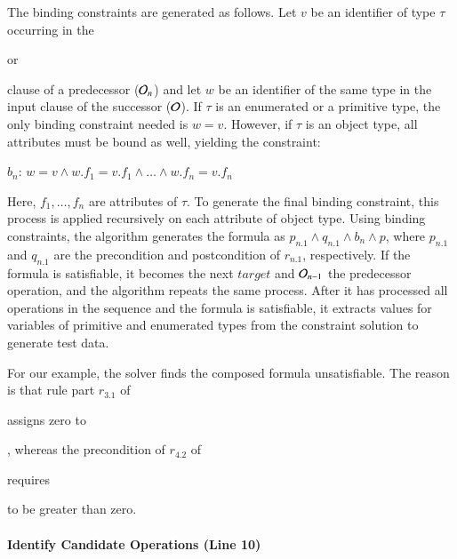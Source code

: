 The binding constraints are generated as follows. Let $v$ be an identifier of
type $\tau$ occurring in the \subject{creates} or \subject{modifies} clause of a
predecessor (\eg ${\cal O}_n$) and let $w$ be an identifier of the same type in
the input clause of the successor (\eg ${\cal O}$). If $\tau$ is an enumerated
or a primitive type, the only binding constraint needed is $w = v$. However, if
$\tau$ is an object type, all attributes must be bound as well, yielding the
constraint:

\vskip 2pt
$b_n$: $w = v \wedge w.f_1 = v.f_1 \wedge \ldots \wedge w.f_n = v.f_n$ 
\vskip 2pt

Here, $f_1, \ldots , f_n$ are attributes of $\tau$. To generate the final
binding constraint, this process is applied recursively on each attribute of
object type. Using binding constraints, the algorithm generates the formula as
$p_{n.1} \wedge q_{n.1} \wedge b_n \wedge p$, where $p_{n.1}$ and $q_{n.1}$ are
the precondition and postcondition of $r_{n.1}$, respectively.  If the formula
is satisfiable, it becomes the next $target$ and ${\cal O}_{n-1}$ the
predecessor operation, and the algorithm repeats the same process.  After it has
processed all operations in the sequence and the formula is satisfiable, it
extracts values for variables of primitive and enumerated types from the
constraint solution to generate test data.

For our example, the solver finds the composed formula unsatisfiable. The reason
is that rule part $r_{3.1}$ of \subject{CreateOrder} assigns zero to
\subject{Order.total}, whereas the precondition of $r_{4.2}$ of
\subject{GenerateInvoice} requires \subject{total} to be greater than zero.



\paragraph*{Identify Candidate Operations (Line 10)}

